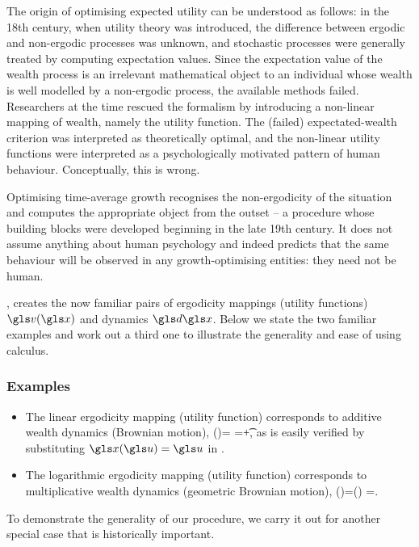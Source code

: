 \begin{itemize}
The origin of optimising expected utility can
be understood as follows: in the 18th century, when utility theory was introduced, 
the difference between
ergodic and non-ergodic processes was unknown, and stochastic
processes were generally treated by computing expectation values. Since
the expectation value of the wealth process is an irrelevant 
mathematical object to an individual whose wealth is well modelled by
a non-ergodic process, the available methods
failed. Researchers at the time rescued the formalism by introducing a non-linear mapping of
wealth, namely the utility function. The (failed) expectated-wealth criterion
was interpreted as theoretically optimal, and the non-linear utility functions
were interpreted as a psychologically motivated pattern of human behaviour. 
Conceptually,  this is wrong.

Optimising time-average growth
recognises the non-ergodicity of the situation and computes the
appropriate object from the outset -- a procedure whose building blocks
were developed beginning in the late 19th century. It does not assume 
anything about human psychology and indeed predicts that the 
same behaviour will be observed in any growth-optimising entities: they
need not be human.

, creates the now familiar pairs of ergodicity mappings (utility functions) $\gv(\x)$ and dynamics
$\gd\x$. Below we state the two familiar examples and work out a third one to illustrate the generality and
ease of using \Ito calculus.


\subsubsection{Examples}
\begin{itemize}
\item
The linear ergodicity mapping (utility function) corresponds to additive wealth dynamics (Brownian motion),
\be
\gv(\x)=\x \hspace{.4cm} \leftrightarrow \hspace{.4cm} \gd\x=\av \gd\t +\bv \gd\gW,\hspace{1.3cm}
\ee
as is easily verified by substituting $\x(\gu)=\gu$ in .
\item
The logarithmic ergodicity mapping (utility function) corresponds to multiplicative wealth dynamics (geometric Brownian motion),
\be
\gv(\x)=\ln(\x) \hspace{.4cm} \leftrightarrow \hspace{.4cm} \gd\x=\x{}.
\ee
\end{itemize}
To demonstrate the generality of our procedure, we carry it out for another 
special case that is historically important.


\end{itemize}
